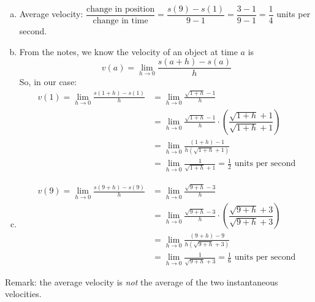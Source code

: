 \begin{solution}
\begin{enumerate}[(a)]
\item Average velocity: $\dfrac{\mbox{change in position}}{\mbox{change in time}} = \dfrac{s(9)-s(1)}{9-1} = \dfrac{3-1}{9-1}=\dfrac{1}{4}$ units per second.


\item From the notes, we know the velocity of an object at time $a$ is
\[v(a)=\lim_{h \rightarrow 0}\frac{s(a+h)-s(a)}{h}\]
So, in our case:
\begin{align*}
v(1)=\lim_{h \rightarrow 0}\frac{s(1+h)-s(1)}{h}
&=\lim_{h \rightarrow 0}\frac{\sqrt{1+h}-1}{h}\\
&=\lim_{h \rightarrow 0}\frac{\sqrt{1+h}-1}{h}\cdot \left( \dfrac{\sqrt{1+h}+1}{\sqrt{1+h}+1}\right)\\
&=\lim_{h \rightarrow 0}\frac{(1+h)-1}{h(\sqrt{1+h}+1)}\\
&=\lim_{h \rightarrow 0}\frac{1}{\sqrt{1+h}+1}=\frac{1}{2}\mbox{ units per second}
\end{align*}


\item \begin{align*}
v(9)=\lim_{h \rightarrow 0}\frac{s(9+h)-s(9)}{h}
&=\lim_{h \rightarrow 0}\frac{\sqrt{9+h}-3}{h}\\
&=\lim_{h \rightarrow 0}\frac{\sqrt{9+h}-3}{h}\cdot \left( \dfrac{\sqrt{9+h}+3}{\sqrt{9+h}+3}\right)\\
&=\lim_{h \rightarrow 0}\frac{(9+h)-9}{h(\sqrt{9+h}+3)}\\
&=\lim_{h \rightarrow 0}\frac{1}{\sqrt{9+h}+3}=\frac{1}{6}\mbox{ units per second}
\end{align*}
\end{enumerate}
Remark: the average velocity is \emph{not} the average of the two instantaneous velocities.
\end{solution}
